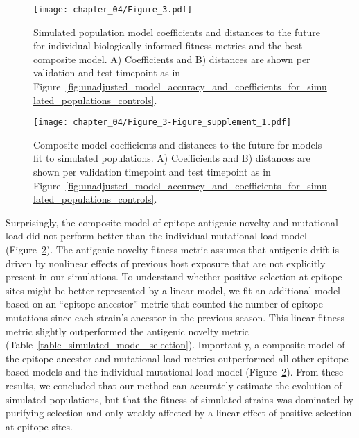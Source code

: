 \begin{figure}
  \texttt{[image: chapter\_04/Figure\_3.pdf]}
  \caption{
    Simulated population model coefficients and distances to the future for individual biologically-informed fitness metrics and the best composite model.
    A) Coefficients and B) distances are shown per validation and test timepoint as in Figure~\ref{fig:unadjusted_model_accuracy_and_coefficients_for_simulated_populations_controls}.
  }
  \label{fig:unadjusted_model_accuracy_and_coefficients_for_simulated_populations}
\end{figure}

\begin{figure}
    \texttt{[image: chapter\_04/Figure\_3-Figure\_supplement\_1.pdf]}
    \caption{
      Composite model coefficients and distances to the future for models fit to simulated populations.
      A) Coefficients and B) distances are shown per validation timepoint and test timepoint as in Figure~\ref{fig:unadjusted_model_accuracy_and_coefficients_for_simulated_populations_controls}.
    }
    \label{fig:unadjusted_composite_model_accuracy_and_coefficients_for_simulated_populations}
\end{figure}

Surprisingly, the composite model of epitope antigenic novelty and mutational load did not perform better than the individual mutational load model (Figure~\ref{fig:unadjusted_composite_model_accuracy_and_coefficients_for_simulated_populations}).
The antigenic novelty fitness metric assumes that antigenic drift is driven by nonlinear effects of previous host exposure \citep{Luksza:2014hj} that are not explicitly present in our simulations.
To understand whether positive selection at epitope sites might be better represented by a linear model, we fit an additional model based on an ``epitope ancestor'' metric that counted the number of epitope mutations since each strain's ancestor in the previous season.
This linear fitness metric slightly outperformed the antigenic novelty metric (Table~\ref{table_simulated_model_selection}).
Importantly, a composite model of the epitope ancestor and mutational load metrics outperformed all other epitope-based models and the individual mutational load model (Figure~\ref{fig:unadjusted_composite_model_accuracy_and_coefficients_for_simulated_populations}).
From these results, we concluded that our method can accurately estimate the evolution of simulated populations, but that the fitness of simulated strains was dominated by purifying selection and only weakly affected by a linear effect of positive selection at epitope sites.

